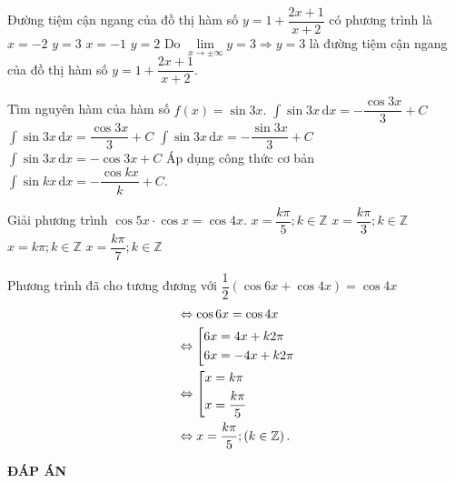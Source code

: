 \begin{ex}%
Đường tiệm cận ngang của đồ thị hàm số $y=1+ \dfrac{2x+1}{x+2}$ có phương trình là
\choice
{$x=-2$}
{\True $y=3$}
{$x=-1$}
{$y=2$}
\loigiai
{ Do $\lim\limits_{x \rightarrow \pm \infty}y =3 \Rightarrow y=3 $ là đường tiệm cận ngang của đồ thị hàm số $y=1+ \dfrac{2x+1}{x+2}$. 
}
\end{ex}
\begin{ex}%
Tìm nguyên hàm của hàm số $f(x)= \sin {3x}.$
\choice
{\True $\displaystyle\int \sin {3x}\mathrm{\,d}x= -\dfrac{\cos {3x}}{3}+C$}
{$\displaystyle\int \sin {3x}\mathrm{\,d}x=\dfrac{\cos {3x}}{3}+C $}
{$\displaystyle\int \sin {3x}\mathrm{\,d}x= -\dfrac{\sin {3x}}{3}+C$}
{$\displaystyle\int \sin {3x}\mathrm{\,d}x= - \cos {3x}+C$}
\loigiai
{ Áp dụng công thức cơ bản $\displaystyle\int \sin {kx}\mathrm{\,d}x= -\dfrac{\cos {kx}}{k}+C.$
}
\end{ex}
\begin{ex}%
Giải phương trình $\cos{5x} \cdot \cos{x} = \cos {4x}.$
\choice
{\True $x = \dfrac{k \pi}{5}; k \in \mathbb{Z}$}
{$x = \dfrac{k \pi}{3}; k \in \mathbb{Z}$}
{$x = k \pi; k \in \mathbb{Z}$}
{$x = \dfrac{k \pi}{7}; k \in \mathbb{Z}$}
\loigiai
{ Phương trình đã cho tương đương với $\dfrac{1}{2} \left( \cos {6x}+ \cos {4x} \right) = \cos {4x}$
\begin{align*}
& \Leftrightarrow \cos {6x} = \cos {4x} \\&\Leftrightarrow \left[\begin{aligned}&6x =4x+ k2 \pi\\&6x =-4x +k2 \pi\end{aligned}\right.\\&
\Leftrightarrow \left[\begin{aligned}&x= k \pi \\& x= \dfrac{k \pi}{5}\end{aligned}\right. \\&\Leftrightarrow x= \dfrac{k \pi}{5}; \left(k \in \mathbb{Z} \right).
\end{align*}

}
\end{ex}

\newpage
\begin{center}
	\textbf{ĐÁP ÁN}
\end{center}
\begin{multicols}{10}
	 
\end{multicols}